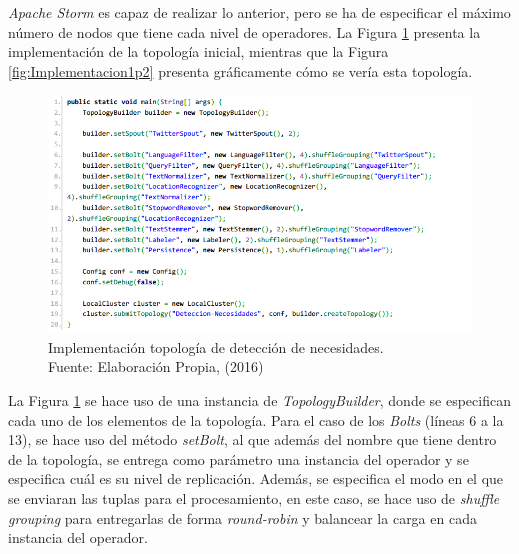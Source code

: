 \textit{Apache Storm} es capaz de realizar lo anterior, pero se ha de especificar el máximo número de nodos que tiene cada nivel de operadores. La Figura \ref{fig:Implementacion1} presenta la implementación de la topología inicial, mientras que la Figura \ref{fig:Implementacion1p2} presenta gráficamente cómo se vería esta topología.

\begin{figure}[H]
	\centering
	\captionsetup{justification=centering}
	\includegraphics[scale=0.8]{images/ImplementacionTopologia1.png}
	\caption[Implementación topología de detección de necesidades.]{Implementación topología de detección de necesidades.\\Fuente: Elaboración Propia, (2016)}
	\label{fig:Implementacion1}
\end{figure}


La Figura \ref{fig:Implementacion1} se hace uso de una instancia de \textit{TopologyBuilder}, donde se especifican cada uno de los elementos de la topología. Para el caso de los \textit{Bolts} (líneas 6 a la 13), se hace uso del método \textit{setBolt}, al que además del nombre que tiene dentro de la topología, se entrega como parámetro una instancia del operador y se especifica cuál es su nivel de replicación. Además, se especifica el modo en el que se enviaran las tuplas para el procesamiento, en este caso, se hace uso de \textit{shuffle grouping} para entregarlas de forma \textit{round-robin} y balancear la carga en cada instancia del operador.

